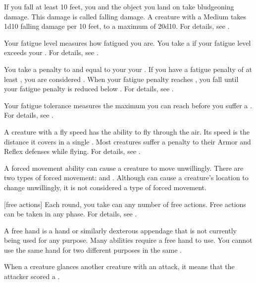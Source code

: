  If you fall at least 10 feet, you and the object you land on take bludgeoning damage.
This damage is called falling damage.
A creature with a Medium  takes 1d10 falling damage per 10 feet, to a maximum of 20d10.
For details, see .

 Your fatigue level measures how fatigued you are.
You take a  if your fatigue level exceeds your .
For details, see .

 You take a penalty to  and  equal to your  \sub your .
If you have a fatigue penalty of at least , you are considered .
When your fatigue penalty reaches , you fall \unconscious until your fatigue penalty is reduced below .
For details, see .

 Your fatigue tolerance measures the maximum  you can reach before you suffer a .
For details, see .

 A creature with a fly speed has the ability to fly through the air.
Its speed is the distance it covers in a single .
Most creatures suffer a  penalty to their Armor and Reflex defenses while flying.
For details, see .

 A forced movement ability can cause a creature to move unwillingly.
There are two types of forced movement:  and .
Although  can cause a creature's location to change unwillingly, it is not considered a type of forced movement.

[free actions] Each round, you take can any number of free actions.
Free actions can be taken in any phase.
For details, see .

 A free hand is a hand or similarly dexterous appendage that is not currently being used for any purpose.
Many abilities require a free hand to use.
You cannot use the same hand for two different purposes in the same .

 When a creature glances another creature with an attack, it means that the attacker scored a .

